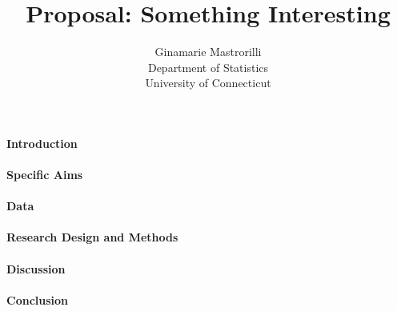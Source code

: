 \documentclass[12pt]{article}
\title{Proposal: Something Interesting}
\author{Ginamarie Mastrorilli\\
  Department of Statistics\\
  University of Connecticut
}
\begin{document}
\maketitle


\paragraph{Introduction}
\lipsum[1] \citep{dwivedi2017analysis}

\paragraph{Specific Aims}
\lipsum[2]

\paragraph{Data}
\lipsum[3]

\paragraph{Research Design and Methods}
\lipsum[4]

\paragraph{Discussion}
\lipsum[5] \citep{wild2004global}

\paragraph{Conclusion}
\lipsum[1]




\end{document}
